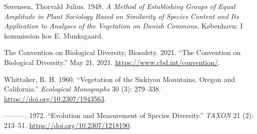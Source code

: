\documentclass[
  12pt,
  oneside]{report}
\begin{document}
\leavevmode\hypertarget{ref-sorensen_method_1948}{}%
Sørensen, Thorvald Julius. 1948. \emph{A Method of Establishing Groups of Equal Amplitude in Plant Sociology Based on Similarity of Species Content and Its Application to Analyses of the Vegetation on Danish Commons.} København: I kommission hos E. Munksgaard.

\leavevmode\hypertarget{ref-the_convention_on_biological_diversity_convention_2021}{}%
The Convention on Biological Diversity, Biosafety. 2021. ``The Convention on Biological Diversity.'' May 21, 2021. \url{https://www.cbd.int/convention/}.

\leavevmode\hypertarget{ref-whittaker_vegetation_1960}{}%
Whittaker, R. H. 1960. ``Vegetation of the Siskiyou Mountains, Oregon and California.'' \emph{Ecological Monographs} 30 (3): 279--338. \url{https://doi.org/10.2307/1943563}.

\leavevmode\hypertarget{ref-whittaker_evolution_1972}{}%
---------. 1972. ``Evolution and Measurement of Species Diversity.'' \emph{TAXON} 21 (2): 213--51. \url{https://doi.org/10.2307/1218190}.
\end{document}
